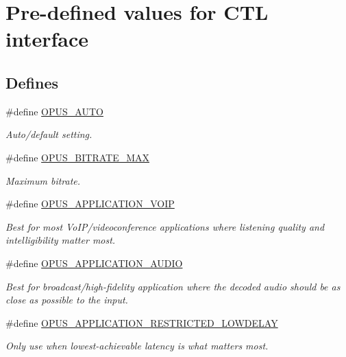 \hypertarget{group__opus__ctlvalues}{
\section{Pre-\/defined values for CTL interface}
\label{group__opus__ctlvalues}
}
\subsection*{Defines}
\begin{DoxyCompactItemize}
\item 
\#define \hyperlink{group__opus__ctlvalues_ga1c5b3244b018ff4548d2d6bffa418472}{OPUS\_\-AUTO}
\begin{DoxyCompactList}\small\item\em Auto/default setting. \item\end{DoxyCompactList}\item 
\#define \hyperlink{group__opus__ctlvalues_gaeadbaa3b4b9e15d39cd1d6e7d91519e5}{OPUS\_\-BITRATE\_\-MAX}
\begin{DoxyCompactList}\small\item\em Maximum bitrate. \item\end{DoxyCompactList}\item 
\#define \hyperlink{group__opus__ctlvalues_ga07884aa018303a419d1f7acb2f3fa669}{OPUS\_\-APPLICATION\_\-VOIP}
\begin{DoxyCompactList}\small\item\em Best for most VoIP/videoconference applications where listening quality and intelligibility matter most. \item\end{DoxyCompactList}\item 
\#define \hyperlink{group__opus__ctlvalues_ga5909f7cb35c04f1110026c6889edd345}{OPUS\_\-APPLICATION\_\-AUDIO}
\begin{DoxyCompactList}\small\item\em Best for broadcast/high-\/fidelity application where the decoded audio should be as close as possible to the input. \item\end{DoxyCompactList}\item 
\#define \hyperlink{group__opus__ctlvalues_ga592232fb39db60c1369989c5c5d19a07}{OPUS\_\-APPLICATION\_\-RESTRICTED\_\-LOWDELAY}
\begin{DoxyCompactList}\small\item\em Only use when lowest-\/achievable latency is what matters most. \item\end{DoxyCompactList}\item 

\end{DoxyCompactItemize}
